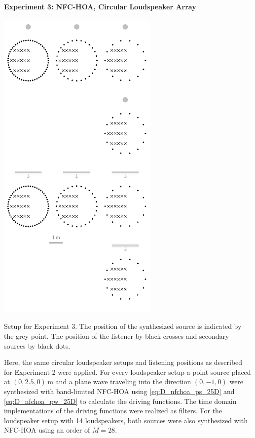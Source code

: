 \paragraph{Experiment 3: \ac{NFC-HOA}, Circular Loudspeaker Array}
\label{sec:experiment3_nfchoa_circular_array}
%
\begin{marginfigure}
    \includegraphics{fig5_03/fig5_03}
    \caption{Setup for Experiment 3. The position of the synthesized
    source is indicated by the grey point. The position of the listener by black
    crosses and secondary sources by black dots.
        }
    \label{fig:setup_hoa_circular_array}
\end{marginfigure}
%
Here, the same circular loudspeaker setups and listening positions as described for
Experiment 2 were applied. For every loudspeaker setup a point source placed at
$(0,2.5,0)$\,m and a plane wave traveling into the direction
$(0,-1,0)$ were synthesized with band-limited \ac{NFC-HOA} using
\eqref{eq:D_nfchoa_ps_25D} and
\eqref{eq:D_nfchoa_pw_25D} to calculate the driving functions. The time domain
implementations of the driving functions were realized as filters.
For the loudspeaker setup with 14 loudspeakers, both sources were
also synthesized with \ac{NFC-HOA} using an order of $M = 28$.

